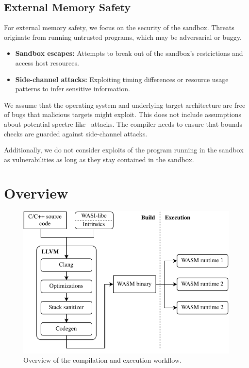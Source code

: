 \subsection{External Memory Safety}
\label{subsec:external-memory-safety}

For external memory safety, we focus on the security of the sandbox.
Threats originate from running untrusted programs, which may be adversarial or buggy.

\begin{itemize}
    \item \textbf{Sandbox escapes:} Attempts to break out of the sandbox's restrictions and access host resources.
    \item \textbf{Side-channel attacks:} Exploiting timing differences or resource usage patterns to infer sensitive information.
\end{itemize}

\noindent
We assume that the operating system and underlying target architecture are free of bugs that malicious targets might exploit.
This does not include assumptions about potential spectre-like~\cite{kocher2020spectre} attacks.
The compiler needs to ensure that bounds checks are guarded against side-channel attacks.

Additionally, we do not consider exploits of the program running in the sandbox as vulnerabilities as long as they stay contained in the sandbox.

\section{Overview}
\label{sec:overview}

\begin{figure}[t]
    \centering
    \includegraphics{figures/build/overview}
    \caption{Overview of the compilation and execution workflow.}
    \label{fig:overview}
\end{figure}

